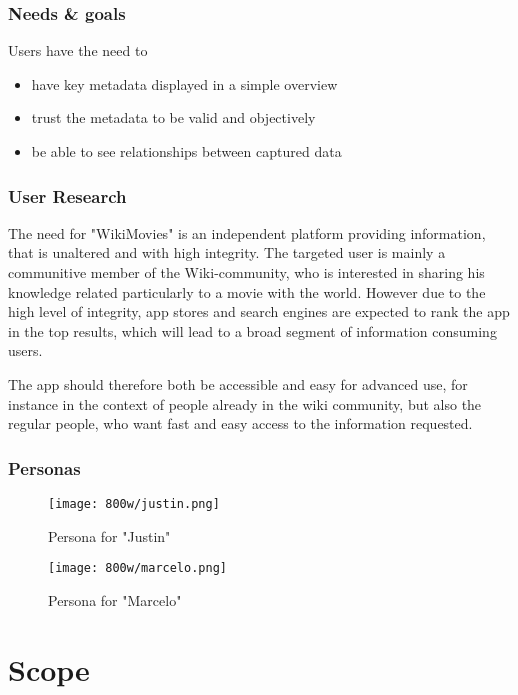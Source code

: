 \documentclass[11pt]{article}
\begin{document}
\subsubsection{Needs \& goals}
Users have the need to
\begin{itemize}
  \item have key metadata displayed in a simple overview
  \item trust the metadata to be valid and objectively
  \item be able to see relationships between captured data
\end{itemize}

\subsubsection{User Research}

The need for "WikiMovies" is an independent platform providing information, that is unaltered and with high integrity. The targeted user is mainly a communitive member of the Wiki-community, who is interested in sharing his knowledge related particularly to a movie with the world. However due to the high level of integrity, app stores and search engines are expected to rank the app in the top results, which will lead to a broad segment of information consuming users.

The app should therefore both be accessible and easy for advanced use, for instance in the context of people already in the wiki community, but also the regular people, who want fast and easy access to the information requested.

\subsubsection{Personas}


\begin{figure}[hbt]
	\centering
	\texttt{[image: 800w/justin.png]}
	\caption{Persona for "Justin"}
\end{figure}

\addvspace{1cm}

\begin{figure}[hbt]
	\centering
	\texttt{[image: 800w/marcelo.png]}
	\caption{Persona for "Marcelo"}
\end{figure}


\section{Scope}
\end{document}
